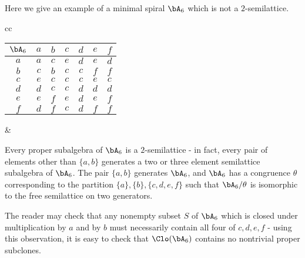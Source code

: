 \begin{ex} Here we give an example of a minimal spiral $\bA_6$ which is not a $2$-semilattice.
\begin{center}
\begin{tabular}{cc}
\begin{tabular}{c | c c c c c c} $\bA_6$ & $a$ & $b$ & $c$ & $d$ & $e$ & $f$\\ \hline $a$ & $a$ & $c$ & $e$ & $d$ & $e$ & $d$\\ $b$ & $c$ & $b$ & $c$ & $c$ & $f$ & $f$\\ $c$ & $e$ & $c$ & $c$ & $c$ & $e$ & $c$\\ $d$ & $d$ & $c$ & $c$ & $d$ & $d$ & $d$\\ $e$ & $e$ & $f$ & $e$ & $d$ & $e$ & $f$\\ $f$ & $d$ & $f$ & $c$ & $d$ & $f$ & $f$ \end{tabular} &
\end{tabular}
\end{center}
Every proper subalgebra of $\bA_6$ is a $2$-semilattice - in fact, every pair of elements other than $\{a,b\}$ generates a two or three element semilattice subalgebra of $\bA_6$. The pair $\{a,b\}$ generates $\bA_6$, and $\bA_6$ has a congruence $\theta$ corresponding to the partition $\{a\}, \{b\}, \{c,d,e,f\}$ such that $\bA_6/\theta$ is isomorphic to the free semilattice on two generators.

The reader may check that any nonempty subset $S$ of $\bA_6$ which is closed under multiplication by $a$ and by $b$ must necessarily contain all four of $c,d,e,f$ - using this observation, it is easy to check that $\Clo(\bA_6)$ contains no nontrivial proper subclones.
\end{ex}

